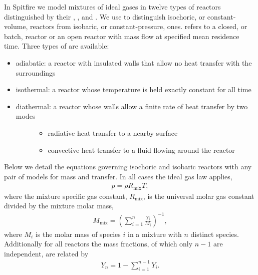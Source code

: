 \documentclass[letterpaper,10pt,english]{sphinxmanual}
\begin{document}
In Spitfire we model mixtures of ideal gases in twelve types of reactors distinguished by their , , and .
We use  to distinguish isochoric, or constant-volume, reactors from isobaric, or constant-pressure, ones.
 refers to a closed, or batch, reactor or an open reactor with mass flow at specified mean residence time.
Three types of  are available:
\begin{itemize}
\item {} 
adiabatic: a reactor with insulated walls that allow no heat transfer with the surroundings

\item {} 
isothermal: a reactor whose temperature is held exactly constant for all time

\item {} \begin{description}
\item[{diathermal: a reactor whose walls allow a finite rate of heat transfer by two modes}] \leavevmode\begin{itemize}
\item {} 
radiative heat transfer to a nearby surface

\item {} 
convective heat transfer to a fluid flowing around the reactor

\end{itemize}

\end{description}

\end{itemize}

Below we detail the equations governing isochoric and isobaric reactors with any pair of models for mass and transfer.
In all cases the ideal gas law applies,
\begin{equation}\label{equation:combustion:ideal_gas_law}
\begin{split}p = \rho R_\mathrm{mix} T,\end{split}
\end{equation}
where the mixture specific gas constant, \(R_\mathrm{mix}\), is the universal molar gas constant divided by the mixture molar mass,
\begin{equation}\label{equation:combustion:mixture_molar_mass}
\begin{split}M_\mathrm{mix} = \left(\sum_{i=1}^{n}\frac{Y_i}{M_i}\right)^{-1},\end{split}
\end{equation}
where \(M_i\) is the molar mass of species \(i\) in a mixture with \(n\) distinct species.
Additionally for all reactors the mass fractions, of which only \(n-1\) are independent, are related by
\begin{equation}\label{equation:combustion:Y_n_eqn}
\begin{split}Y_n = 1 - \sum_{i=1}^{n-1}Y_i.\end{split}
\end{equation}
\end{document}
